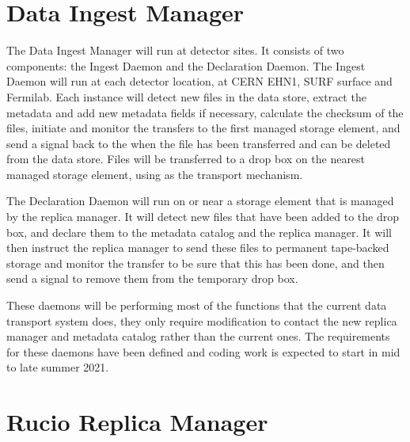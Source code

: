 \documentclass[../main-v1.tex]{subfiles}
\begin{document}

\section{Data Ingest Manager }

The Data Ingest Manager will run at detector sites.  It consists of two components:  the Ingest Daemon and the Declaration Daemon.  The Ingest Daemon will 
run at each detector location, at CERN EHN1, SURF surface and Fermilab. Each instance will
detect new files in the data store, extract the metadata and add new metadata fields
if necessary, calculate the checksum of the files, initiate and monitor the transfers to the first managed 
storage element, and send a signal back to the  when the file has been transferred and can be deleted from the data store.
Files will be transferred to a drop box on the nearest managed storage element, using  %
as the transport mechanism.  

The Declaration Daemon will run on or near a storage element that is managed by the replica manager. %
It will detect new files that have been added to the drop box, and declare them to the metadata catalog and the replica manager.  It will then instruct the replica manager to send these files to permanent tape-backed storage and monitor the transfer to be sure that this has been done, and then send a signal to remove them from the temporary drop box.

These daemons will be performing most of the functions that the current data transport system does, they only 
require modification to contact the new replica manager and metadata catalog rather than the current ones.  The 
requirements for these daemons have been defined   and %
coding work is expected to start in mid to late summer 2021. 

\section{Rucio Replica Manager }
\end{document}
